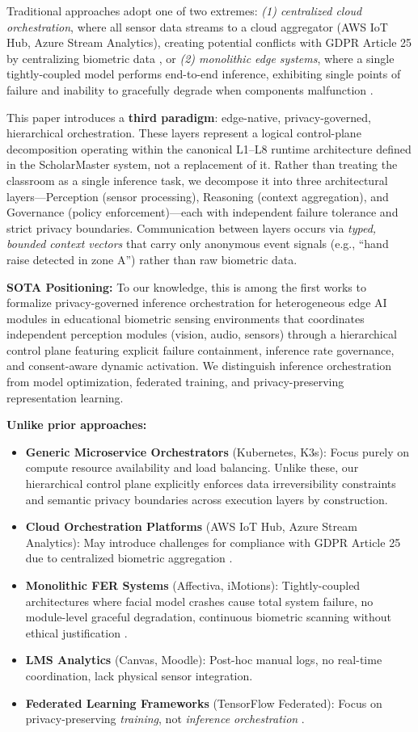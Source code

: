 \documentclass[conference]{IEEEtran}
\begin{document}
Traditional approaches adopt one of two extremes: \textit{(1) centralized cloud orchestration}, where all sensor data streams to a cloud aggregator (AWS IoT Hub, Azure Stream Analytics), creating potential conflicts with GDPR Article 25 by centralizing biometric data \cite{b4, b15}, or \textit{(2) monolithic edge systems}, where a single tightly-coupled model performs end-to-end inference, exhibiting single points of failure and inability to gracefully degrade when components malfunction \cite{b5}.

This paper introduces a \textbf{third paradigm}: edge-native, privacy-governed, hierarchical orchestration. These layers represent a logical control-plane decomposition operating within the canonical L1--L8 runtime architecture defined in the ScholarMaster system, not a replacement of it. Rather than treating the classroom as a single inference task, we decompose it into three architectural layers---Perception (sensor processing), Reasoning (context aggregation), and Governance (policy enforcement)---each with independent failure tolerance and strict privacy boundaries. Communication between layers occurs via \textit{typed, bounded context vectors} that carry only anonymous event signals (e.g., ``hand raise detected in zone A'') rather than raw biometric data.

\textbf{SOTA Positioning:} To our knowledge, this is among the first works to formalize privacy-governed inference orchestration for heterogeneous edge AI modules in educational biometric sensing environments that coordinates independent perception modules (vision, audio, sensors) through a hierarchical control plane featuring explicit failure containment, inference rate governance, and consent-aware dynamic activation. We distinguish inference orchestration from model optimization, federated training, and privacy-preserving representation learning.

\textbf{Unlike prior approaches:}
\begin{itemize}
\item \textbf{Generic Microservice Orchestrators} (Kubernetes, K3s): Focus purely on compute resource availability and load balancing. Unlike these, our hierarchical control plane explicitly enforces data irreversibility constraints and semantic privacy boundaries across execution layers by construction.
\item \textbf{Cloud Orchestration Platforms} (AWS IoT Hub, Azure Stream Analytics): May introduce challenges for compliance with GDPR Article 25 due to centralized biometric aggregation \cite{b6}.
\item \textbf{Monolithic FER Systems} (Affectiva, iMotions): Tightly-coupled architectures where facial model crashes cause total system failure, no module-level graceful degradation, continuous biometric scanning without ethical justification \cite{b7}.
\item \textbf{LMS Analytics} (Canvas, Moodle): Post-hoc manual logs, no real-time coordination, lack physical sensor integration.
\item \textbf{Federated Learning Frameworks} (TensorFlow Federated): Focus on privacy-preserving \textit{training}, not \textit{inference orchestration} \cite{b8}.
\end{itemize}
\end{document}
